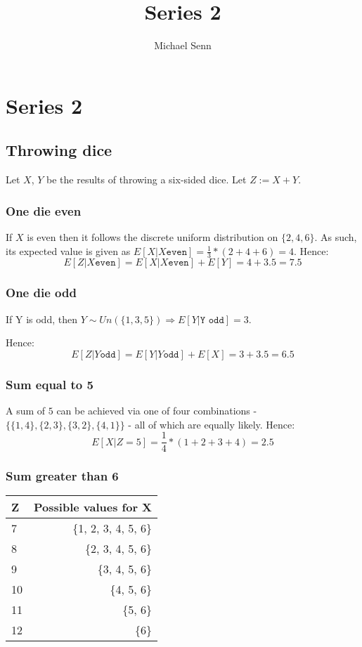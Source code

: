 \documentclass[a4paper]{scrreprt}
\title{Series 2}
\author{Michael Senn \maillink{michael.senn@students.unibe.ch}}
\date{\printdate}
\begin{document}
\maketitle


\setcounter{chapter}{1}
\chapter{Series 2}

\section{Throwing dice}

Let $X$, $Y$ be the results of throwing a six-sided dice. Let $Z := X + Y$.

\subsection{One die even}

If $X$ is even then it follows the discrete uniform distribution on $\{2, 4,
6\}$. As such, its expected value is given as $E[X | X \texttt{even}] = \frac{1}{3} * (2
+ 4 + 6) = 4$. Hence:
\[
	E[Z | X \texttt{even}] = E[X | X \texttt{even}] + E[Y] = 4 + 3.5 = 7.5
\]

\subsection{One die odd}

If Y is odd, then $Y \sim Un(\{1, 3, 5\}) \Rightarrow E[Y | \texttt{Y odd}] = 3$.

Hence:
\[
	E[Z | Y \texttt{odd}] = E[Y | Y \texttt{odd}] + E[X] = 3 + 3.5 = 6.5
\]

\subsection{Sum equal to 5}

A sum of $5$ can be achieved via one of four combinations - $\{\{1, 4\}, \{2,
3\}, \{3, 2\}, \{4, 1\}\}$ - all of which are equally likely. Hence:
\[
	E[X | Z = 5] = \frac{1}{4} * (1 + 2 + 3 + 4) = 2.5
\]

\subsection{Sum greater than 6}

\begin{tabular}{|l|r|}
	\hline
	Z & Possible values for X \\
	\hline
	7 & \{1, 2, 3, 4, 5, 6\} \\
	\hline
	8 & \{2, 3, 4, 5, 6\} \\
	\hline
	9 & \{3, 4, 5, 6\} \\
	\hline
	10 & \{4, 5, 6\} \\
	\hline
	11 & \{5, 6\} \\
	\hline
	12 & \{6\} \\
	\hline
\end{tabular}
\end{document}
